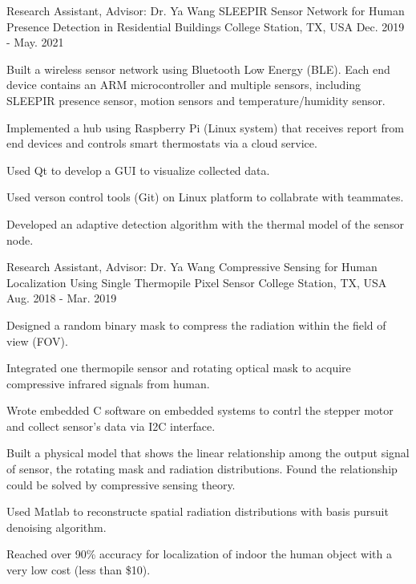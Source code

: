 \begin{cventries}
  \cventry
    {Research Assistant, Advisor: Dr. Ya Wang} %
    {SLEEPIR Sensor Network for Human Presence Detection in Residential Buildings} %
    {College Station, TX, USA} %
    {Dec. 2019 - May. 2021} %
    {
      \begin{cvitems} %
        \item Built a wireless sensor network using Bluetooth Low Energy (BLE). Each end device contains an ARM microcontroller and multiple sensors, including SLEEPIR presence sensor, motion sensors and temperature/humidity sensor.
        \item Implemented a hub using Raspberry Pi (Linux system) that receives report from end devices and controls smart thermostats via a cloud service.
        \item Used Qt to develop a GUI to visualize collected data.
        \item Used verson control tools (Git) on Linux platform to collabrate with teammates.
        \item Developed an adaptive detection algorithm with the thermal model of the sensor node.
      \end{cvitems}
    }


  \cventry
    {Research Assistant, Advisor: Dr. Ya Wang} %
    {Compressive Sensing for Human Localization Using Single Thermopile Pixel Sensor} %
    {College Station, TX, USA} %
    {Aug. 2018 - Mar. 2019} %
    {
      \begin{cvitems} %
        \item Designed a random binary mask to compress the radiation within the field of view (FOV).
        \item Integrated one thermopile sensor and rotating optical mask to acquire compressive infrared signals from human.
        \item Wrote embedded C software on embedded systems to contrl the stepper motor and collect sensor's data via I2C interface.
        \item Built a physical model that shows the linear relationship among the output signal of sensor, the rotating mask and radiation distributions. Found the relationship could be solved by compressive sensing theory.
        \item Used Matlab to reconstructe spatial radiation distributions with basis pursuit denoising algorithm.
        \item Reached over 90\% accuracy for localization of indoor the human object with a very low cost (less than \$10).
      \end{cvitems}
    }


\end{cventries}
